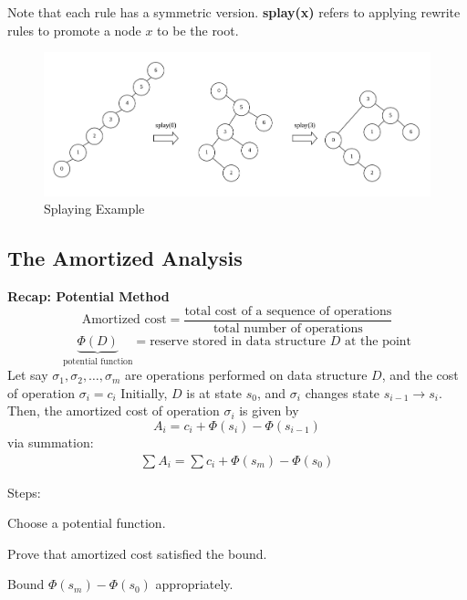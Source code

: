 \documentclass[12pt]{article}
\begin{document}
Note that each rule has a symmetric version. \textbf{splay(x)} refers to applying rewrite
rules to promote a node $x$ to be the root.

\begin{figure}[h]
  \centering
  \includegraphics[scale=0.5]{example-1.png}
  \caption{Splaying Example}
\end{figure}

\subsection{The Amortized Analysis}

\begin{tcolorbox}
\textbf{Recap: Potential Method}
$$ \text{Amortized cost} = \frac{\text{total cost of a sequence of operations}}{\text{total number
of operations}} $$
$$ \underbrace{\Phi(D)}_{\text{potential function}} = \text{reserve stored in data structure $D$ at
the point} $$
Let say $\sigma_1, \sigma_2, \dots, \sigma_m$ are operations performed on data structure $D$, and the
cost of operation $\sigma_i = c_i$
Initially, $D$ is at state $s_0$, and $\sigma_i$ changes state $s_{i-1} \rightarrow s_i$.
Then, the amortized cost of operation $\sigma_i$ is given by $$A_i = c_i + \Phi(s_i) -
\Phi(s_{i-1})$$
via summation:
\begin{align}
    \sum A_i = \sum c_i + \Phi(s_m) - \Phi(s_0)
\end{align}

Steps:
\begin{steps}[leftmargin=3cm]
 \item Choose a potential function.
 \item Prove that amortized cost satisfied the bound.
 \item Bound $\Phi(s_m) - \Phi(s_0)$ appropriately.
\end{steps}
\end{tcolorbox}
\end{document}

